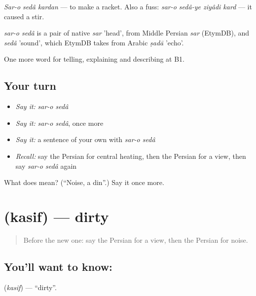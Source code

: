 \emph{Sar-o sedâ kardan} — to make a racket. Also a fuss: \emph{sar-o sedâ-ye ziyâdi kard} — it caused a stir.

\begin{cousinweb}
\emph{sar-o sedâ} is a pair of native \emph{sar} 'head', from Middle Persian \emph{sar} (EtymDB), and \emph{sedâ} 'sound', which EtymDB takes from Arabic \emph{ṣadā} 'echo'.
\end{cousinweb}

\begin{grammarlens}[title={What you've built}]
One more word for telling, explaining and describing at B1.
\end{grammarlens}

\subsection*{Your turn}
\begin{itemize}
\raggedright
  \item \emph{Say it:} \emph{sar-o sedâ}
  \item \emph{Say it:} \emph{sar-o sedâ}, once more
  \item \emph{Say it:} a sentence of your own with \emph{sar-o sedâ}
  \item \emph{Recall:} say the Persian for central heating, then the Persian for a view, then say \emph{sar-o sedâ} again
\end{itemize}

\begin{tcolorbox}[breakable,colback=teal!4,colframe=teal!35!black,title={Before you move on}]
What does    mean? (\textquotedblleft{}Noise, a din\textquotedblright{}.) Say it once more.
\end{tcolorbox}
\section[\texorpdfstring{\fa{کثیف} (kasif)}{کثیف (kasif)}]{ (kasif) — dirty}

\label{lesson:FA-C440-kasif}



\begin{quote}
Before the new one: say the Persian for a view, then the Persian for noise.
\end{quote}

\subsection*{You'll want to know: }
\textbf{} (\emph{kasif}) — \textquotedblleft{}dirty\textquotedblright{}.

